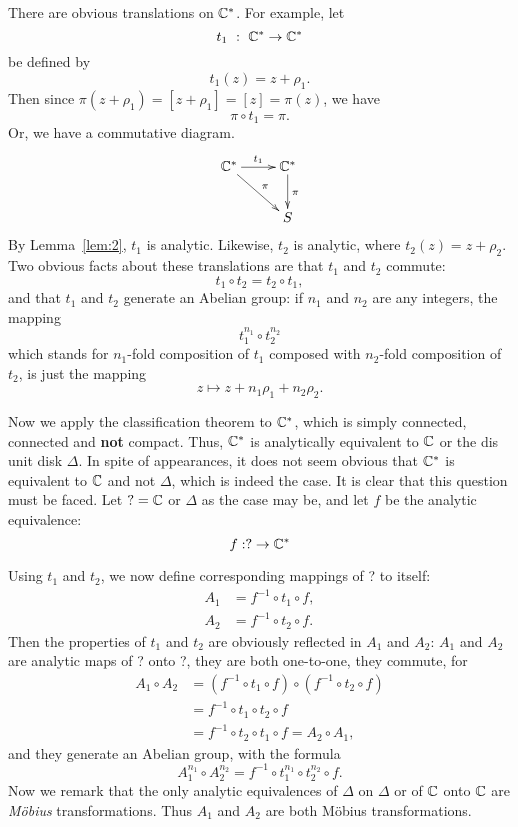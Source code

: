 \documentclass[a4paper,11pt]{article}
\begin{document}
There are obvious translations on ${\mathbb C}^*$.  For example, let
$$
t_1 ~:~ {\mathbb C}^* \to {\mathbb C}^*
$$
be defined by
$$
t_1(z) = z + \rho_1.
$$
Then since $\pi(z + \rho_1) = [z + \rho_1] = [z] = \pi(z)$, we have
$$
\pi \circ t_1 = \pi.
$$
Or, we have a commutative diagram.
$$
\xymatrix{
  \CCC^* \ar[r]^{t_1} \ar[dr]^\pi & \CCC^* \ar[d]^\pi\\
  & S
}
$$
By Lemma~\ref{lem:2}, $t_1$ is analytic.  Likewise, $t_2$ is analytic,
where $t_2(z) = z + \rho_2$.  Two obvious facts about these
translations are that $t_1$ and $t_2$ commute:
$$
t_1 \circ t_2 = t_2 \circ t_1,
$$
and that $t_1$ and $t_2$ generate an Abelian group: if $n_1$ and $n_2$
are any integers, the mapping
$$
t_1^{n_1} \circ t_2^{n_2}
$$
which stands for $n_1$-fold composition of $t_1$ composed with
$n_2$-fold composition of $t_2$, is just the mapping
$$
z \mapsto z + n_1 \rho_1 + n_2 \rho_2.
$$

Now we apply the classification theorem to ${\mathbb C}^*$, which is simply
connected, connected and \textbf{not} compact.  Thus, ${\mathbb C}^*$ is
analytically equivalent to ${\mathbb C}$ or the dis unit disk $\Delta$.  In
spite of appearances, it does not seem obvious that ${\mathbb C}^*$ is
equivalent to ${\mathbb C}$ and not $\Delta$, which is indeed the case.  It
is clear that this question must be faced.  Let $? = {\mathbb C}$ or $\Delta$
as the case may be, and let $f$ be the analytic equivalence:
$$
f : ? \to {\mathbb C}^*
$$

Using $t_1$ and $t_2$, we now define corresponding mappings of ? to
itself:
$$
\begin{aligned}
  A_1 &= f^{-1} \circ t_1 \circ f,\\
  A_2 &= f^{-1} \circ t_2 \circ f.
\end{aligned}
$$
Then the properties of $t_1$ and $t_2$ are obviously reflected in
$A_1$ and $A_2$: $A_1$ and $A_2$ are analytic maps of ? onto ?, they
are both one-to-one, they commute, for
$$
\begin{aligned}
  A_1 \circ A_2 
  &= (f^{-1} \circ t_1 \circ f) \circ (f^{-1} \circ t_2 \circ f)\\
  &= f^{-1} \circ t_1 \circ t_2 \circ f\\
  &= f^{-1} \circ t_2 \circ t_1 \circ f  = A_2 \circ A_1,
\end{aligned}
$$
and they generate an Abelian group, with the formula
$$
A_1^{n_1} \circ A_2^{n_2} = f^{-1} \circ t_1^{n_1} \circ t_2^{n_2} \circ f.
$$
Now we remark that the only analytic equivalences of $\Delta$ on
$\Delta$ or of ${\mathbb C}$ onto ${\mathbb C}$ are \emph{M\"obius}
transformations.  Thus $A_1$ and $A_2$ are both M\"obius
transformations.
\end{document}
